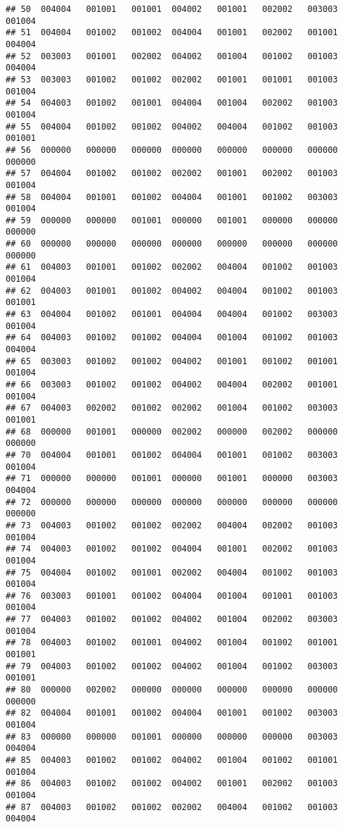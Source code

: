 \documentclass[
]{article}
\begin{document}
\begin{verbatim}
## 50  004004   001001   001001  004002   001001   002002   003003   001004
## 51  004004   001002   001002  004004   001001   002002   001001   004004
## 52  003003   001001   002002  004002   001004   001002   001003   004004
## 53  003003   001002   001002  002002   001001   001001   001003   001004
## 54  004003   001002   001001  004004   001004   002002   001003   001004
## 55  004004   001002   001002  004002   004004   001002   001003   001001
## 56  000000   000000   000000  000000   000000   000000   000000   000000
## 57  004004   001002   001002  002002   001001   002002   001003   001004
## 58  004004   001001   001002  004004   001001   001002   003003   001004
## 59  000000   000000   001001  000000   001001   000000   000000   000000
## 60  000000   000000   000000  000000   000000   000000   000000   000000
## 61  004003   001001   001002  002002   004004   001002   001003   001004
## 62  004003   001001   001002  004002   004004   001002   001003   001001
## 63  004004   001002   001001  004004   004004   001002   003003   001004
## 64  004003   001002   001002  004004   001004   001002   001003   004004
## 65  003003   001002   001002  004002   001001   001002   001001   001004
## 66  003003   001002   001002  004002   004004   002002   001001   001004
## 67  004003   002002   001002  002002   001004   001002   003003   001001
## 68  000000   001001   000000  002002   000000   002002   000000   000000
## 70  004004   001001   001002  004004   001001   001002   003003   001004
## 71  000000   000000   001001  000000   001001   000000   003003   004004
## 72  000000   000000   000000  000000   000000   000000   000000   000000
## 73  004003   001002   001002  002002   004004   002002   001003   001004
## 74  004003   001002   001002  004004   001001   002002   001003   001004
## 75  004004   001002   001001  002002   004004   001002   001003   001004
## 76  003003   001001   001002  004004   001004   001001   001003   001004
## 77  004003   001002   001002  004002   001004   002002   003003   001004
## 78  004003   001002   001001  004002   001004   001002   001001   001001
## 79  004003   001002   001002  004002   001004   001002   003003   001001
## 80  000000   002002   000000  000000   000000   000000   000000   000000
## 82  004004   001001   001002  004004   001001   001002   003003   001004
## 83  000000   000000   001001  000000   000000   000000   003003   004004
## 85  004003   001002   001002  004002   001004   001002   001001   001004
## 86  004003   001002   001002  004002   001001   002002   001003   001004
## 87  004003   001002   001002  002002   004004   001002   001003   004004

\end{verbatim}
\end{document}
